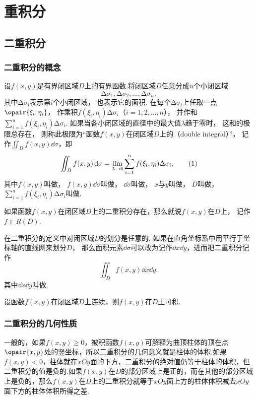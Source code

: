 \chapter{重积分}
\section{二重积分}
\subsection{二重积分的概念}
\begin{definition}
设\(f(x,y)\)是有界闭区域\(D\)上的有界函数.将闭区域\(D\)任意分成\(n\)个小闭区域\[
\increment\sigma_1,\increment\sigma_2,\dotsc,\increment\sigma_n,
\]其中\(\increment\sigma_i\)表示第\(i\)个小闭区域，%
也表示它的面积.
在每个\(\increment\sigma_i\)上任取一点\(\opair{\xi_i,\eta_i}\)，%
作乘积\(f(\xi_i,\eta_i) \increment\sigma_i\)（\(i=1,2,\dotsc,n\)），%
并作和\(\sum\limits_{i=1}^n f(\xi_i,\eta_i) \increment\sigma_i\).
如果当各小闭区域的直径中的最大值\(\lambda\)趋于零时，%
这和的极限总存在，%
则称此极限为“函数\(f(x,y)\)在闭区域\(D\)上的（double integral）”，%
记作\(\iint_D f(x,y) \dd{\sigma}\)，即
\begin{gather}
\iint_D f(x,y) \dd{\sigma}
= \lim\limits_{\lambda\to0} \sum\limits_{i=1}^n f(\xi_i,\eta_i) \increment\sigma_i,
\tag1
\end{gather}
其中\(f(x,y)\)叫做，%
\(f(x,y) \dd{\sigma}\)叫做，%
\(\dd{\sigma}\)叫做，%
\(x\)与\(y\)叫做，%
\(D\)叫做，%
\(\sum\limits_{i=1}^n f(\xi_i,\eta_i) \increment\sigma_i\)叫做.

如果函数\(f(x,y)\)在闭区域\(D\)上的二重积分存在，那么就说\(f(x,y)\)在\(D\)上，%
记作\(f \in R(D)\).

在二重积分的定义中对闭区域\(D\)的划分是任意的.
如果在直角坐标系中用平行于坐标轴的直线网来划分\(D\)，%
那么面积元素\(\dd{\sigma}\)可以改为记作\(\dd{x}\dd{y}\)，进而把二重积分记作\[
\iint_{D}{f(x,y)\dd{x}\dd{y}},
\]其中\(\dd{x}\dd{y}\)叫做.
\end{definition}

\begin{theorem}[充分条件]
设函数\(f(x,y)\)在闭区域\(D\)上连续，则\(f(x,y)\)在\(D\)上可积.
\end{theorem}

\subsection{二重积分的几何性质}
一般的，如果\(f(x,y) \geqslant 0\)，被积函数\(f(x,y)\)可解释为曲顶柱体的顶在点\(\opair{x,y}\)处的竖坐标，所以二重积分的几何意义就是柱体的体积.如果\(f(x,y) < 0\)，柱体就在\(xOy\)面的下方，二重积分的绝对值仍等于柱体的体积，但二重积分的值是负的.如果\(f(x,y)\)在\(D\)的部分区域上是正的，而在其他的部分区域上是负的，那么\(f(x,y)\)在\(D\)上的二重积分就等于\(xOy\)面上方的柱体体积减去\(xOy\)面下方的柱体体积所得之差.

